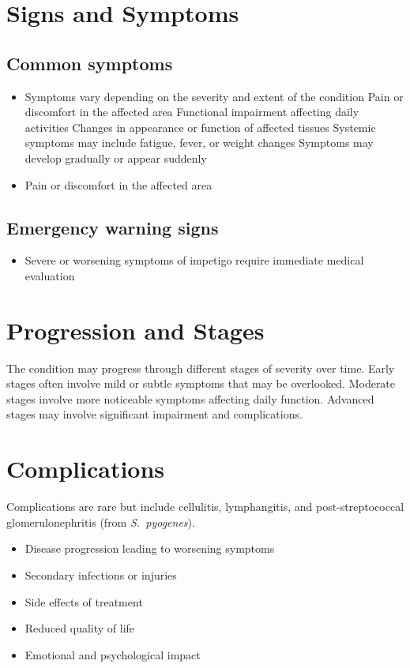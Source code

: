 \section{Signs and Symptoms}

\subsection{Common symptoms}
\begin{itemize}[noitemsep]
  \item Symptoms vary depending on the severity and extent of the condition Pain or discomfort in the affected area Functional impairment affecting daily activities Changes in appearance or function of affected tissues Systemic symptoms may include fatigue, fever, or weight changes Symptoms may develop gradually or appear suddenly
  \item Pain or discomfort in the affected area
  \end{itemize}

\subsection{Emergency warning signs}
\begin{itemize}[noitemsep]
  \item Severe or worsening symptoms of impetigo require immediate medical evaluation
\end{itemize}
\section{Progression and Stages}
The condition may progress through different stages of severity over time. Early stages often involve mild or subtle symptoms that may be overlooked. Moderate stages involve more noticeable symptoms affecting daily function. Advanced stages may involve significant impairment and complications.
\section{Complications}
Complications are rare but include cellulitis, lymphangitis, and post-streptococcal glomerulonephritis (from \textit{S.~pyogenes}).

\begin{itemize}[noitemsep]
  \item Disease progression leading to worsening symptoms
  \item Secondary infections or injuries
  \item Side effects of treatment
  \item Reduced quality of life
  \item Emotional and psychological impact
\end{itemize}
